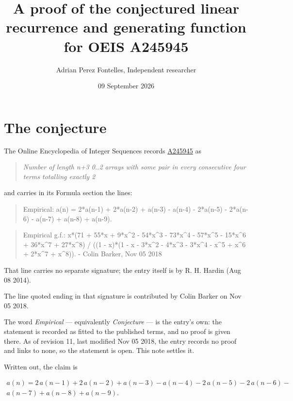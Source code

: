 \documentclass[11pt]{article}
\title{A proof of the conjectured linear recurrence and generating function for OEIS A245945}
\author{Adrian Perez Fontelles, Independent researcher}
\date{09 September 2026}
\theoremstyle{definition}
\begin{document}
\maketitle
\section{The conjecture}

The Online Encyclopedia of Integer Sequences records \href{https://oeis.org/A245945}{A245945} as

\begin{quote}\itshape Number of length n+3 0..2 arrays with some pair in every consecutive four terms totalling exactly 2\end{quote}

and carries in its Formula section the lines:

\begin{quote}\ttfamily Empirical: a(n) = 2*a(n-1) + 2*a(n-2) + a(n-3) - a(n-4) - 2*a(n-5) - 2*a(n-6) - a(n-7) + a(n-8) + a(n-9).\end{quote}

\begin{quote}\ttfamily Empirical g.f.: x*(71 + 55*x + 9*x\textasciicircum{}2 - 54*x\textasciicircum{}3 - 73*x\textasciicircum{}4 - 57*x\textasciicircum{}5 - 15*x\textasciicircum{}6 + 36*x\textasciicircum{}7 + 27*x\textasciicircum{}8) / ((1 - x)*(1 - x - 3*x\textasciicircum{}2 - 4*x\textasciicircum{}3 - 3*x\textasciicircum{}4 - x\textasciicircum{}5 + x\textasciicircum{}6 + 2*x\textasciicircum{}7 + x\textasciicircum{}8)). - Colin Barker, Nov 05 2018\end{quote}

That line carries no separate signature; the entry itself is by R. H. Hardin (Aug 08 2014).

The line quoted ending in that signature is contributed by Colin Barker on Nov 05 2018.

The word {\itshape Empirical} --- equivalently {\itshape Conjecture} --- is the entry's own: the statement is recorded as fitted to the published terms, and no proof is given there. As of revision 11, last modified Nov 05 2018, the entry records no proof and links to none, so the statement is open. This note settles it.

Written out, the claim is

\begin{multline*} a(n) = 2\,a(n-1) + 2\,a(n-2) + a(n-3) - a(n-4) - 2\,a(n-5) - 2\,a(n-6) - \\ a(n-7) + a(n-8) + a(n-9). \end{multline*}
\end{document}
